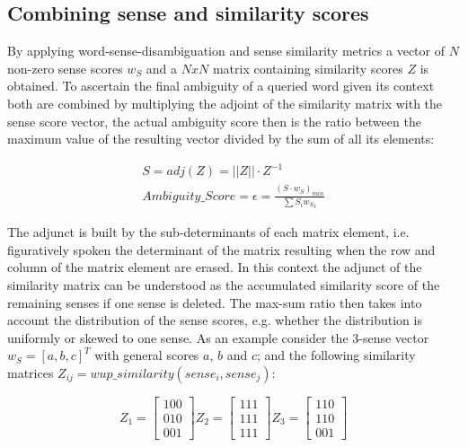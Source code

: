 \documentclass{custom_report}
\begin{document}
\subsection{Combining sense and similarity scores}
By applying word-sense-disambiguation and sense similarity metrics a vector of $N$ non-zero sense scores $w_S$ and a $NxN$ matrix containing similarity scores $Z$ is obtained. To ascertain the final ambiguity of a queried word given its context both are combined by multiplying the adjoint of the similarity matrix with the sense score vector, the actual ambiguity score then is the ratio between the maximum value of the resulting vector divided by the sum of all its elements: 

\begin{align*}
S = adj(Z) = ||Z|| \cdot Z^{-1} \\
Ambiguity\_Score = \epsilon  = \frac{(S \cdot w_S)_{min}}{\sum S_i {w_S}_i}
\end{align*}

The adjunct is built by the sub-determinants of each matrix element, i.e. figuratively spoken the determinant of the matrix resulting when the row and column of the matrix element are erased. In this context the adjunct of the similarity matrix can be understood as the accumulated similarity score of the remaining senses if one sense is deleted. The max-sum ratio then takes into account the distribution of the sense scores, e.g. whether the distribution is uniformly or skewed to one sense.
\newline
As an example consider the 3-sense vector $w_S = [a, b, c]^T$ with general scores $a$, $b$ and $c$; and the following similarity matrices $Z_{ij} = wup\_similarity(sense_i, sense_j)$: 

$$Z_1 = \begin{bmatrix} 1 0 0 \\ 0 1 0 \\ 0 0 1\end{bmatrix} Z_2 = \begin{bmatrix} 1 1 1 \\ 1 1 1 \\ 1 1 1\end{bmatrix} Z_3 = \begin{bmatrix} 1 1 0 \\ 1 1 0 \\ 0 0 1\end{bmatrix}$$
\end{document}
